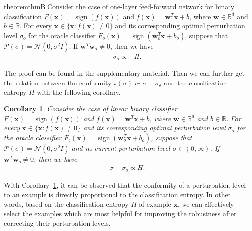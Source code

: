 \documentclass[letterpaper]{article} %
\newtheorem{corollary}{Corollary}[theorem]
\begin{document}
\begin{restatable}[]{theorem}{thmB}
	\label{theorem:thmB}
	Consider the case of one-layer feed-forward network for binary classification $F(\mathbf{x}) = \operatorname{sign}(f(\mathbf{x}))$ and $f(\mathbf{x}) = \mathbf{w}^T \mathbf{x} + b$, where $\mathbf{w} \in \mathbb{R}^d$ and $b \in \mathbb{R}$.
	For every $\mathbf{x} \in \{\mathbf{x}: f(\mathbf{x}) \neq 0\}$ and its corresponding optimal perturbation level $\sigma_o$ for the oracle classifier $F_o(\mathbf{x})=\operatorname{sign}(\mathbf{w}_o^T\mathbf{x}+b_o)$, suppose that $\mathcal{P}(\sigma) = \mathcal{N}(0, \sigma^{2} I)$. If $\mathbf{w}^T \mathbf{w}_o \neq 0$, then we have
	\begin{align}
	\sigma_o \propto -H.
	\end{align}
\end{restatable}
The proof can be found in the supplementary material. Then we can further get the relation between the conformity $s(\sigma) \coloneqq \sigma-\sigma_o$ and the classification entropy $H$ with the following corollary.

\begin{corollary}
	\label{corollary:cor1}
	Consider the case of linear binary classifier $F(\mathbf{x}) = \operatorname{sign}(f(\mathbf{x}))$ and $f(\mathbf{x}) = \mathbf{w}^T \mathbf{x} + b$, where $\mathbf{w} \in \mathbb{R}^d$ and $b \in \mathbb{R}$.
	For every $\mathbf{x} \in \{\mathbf{x}: f(\mathbf{x}) \neq 0\}$ and its corresponding optimal perturbation level $\sigma_o$ for the oracle classifier $F_o(\mathbf{x})=\operatorname{sign}(\mathbf{w}_o^T\mathbf{x}+b_o)$, suppose that $\mathcal{P}(\sigma) = \mathcal{N}(0, \sigma^{2} I)$ and its current perturbation level $\sigma \in (0, \infty)$. If $\mathbf{w}^T \mathbf{w}_o \neq 0$, then we have
	\begin{align}
	\sigma - \sigma_o \propto H.
	\end{align}
\end{corollary}

With Corollary~\ref{corollary:cor1}, it can be observed that the conformity of a perturbation level to an example is directly proportional to the classification entropy. In other words, based on the classification entropy $H$ of example $\mathbf{x}$, we can effectively select the examples which are most helpful for improving the robustness after correcting their perturbation levels.
\end{document}
